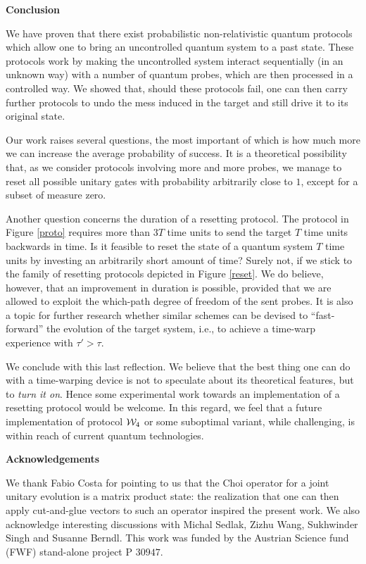 \documentclass[twocolumn,prx,aps,longbibliography]{revtex4-1}
\begin{document}
\vspace{10pt}
\noindent\textbf{Conclusion}

We have proven that there exist probabilistic non-relativistic quantum protocols which allow one to bring an uncontrolled quantum system to a past state. These protocols work by making the uncontrolled system interact sequentially (in an unknown way) with a number of quantum probes, which are then processed in a controlled way. We showed that, should these protocols fail, one can then carry further protocols to undo the mess induced in the target and still drive it to its original state.

Our work raises several questions, the most important of which is how much more we can increase the average probability of success. It is a theoretical possibility that, as we consider protocols involving more and more probes, we manage to reset all possible unitary gates with probability arbitrarily close to $1$, except for a subset of measure zero. 

Another question concerns the duration of a resetting protocol. The protocol in Figure \ref{proto} requires more than $3T$ time units to send the target $T$ time units backwards in time. Is it feasible to reset the state of a quantum system $T$ time units by investing an arbitrarily short amount of time? Surely not, if we stick to the family of resetting protocols depicted in Figure \ref{reset}. We do believe, however, that an improvement in duration is possible, provided that we are allowed to exploit the which-path degree of freedom of the sent probes. It is also a topic for further research whether similar schemes can be devised to ``fast-forward'' the evolution of the target system, i.e., to achieve a time-warp experience with $\tau'> \tau$.

We conclude with this last reflection. We believe that the best thing one can do with a time-warping device is not to speculate about its theoretical features, but to \emph{turn it on}. Hence some experimental work towards an implementation of a resetting protocol would be welcome. In this regard, we feel that a future implementation of protocol ${\cal W}_4$ or some suboptimal variant, while challenging, is within reach of current quantum technologies.



\vspace{10pt}
\noindent\textbf{Acknowledgements}

\noindent We thank Fabio Costa for pointing to us that the Choi operator for a joint unitary evolution is a matrix product state: the realization that one can then apply cut-and-glue vectors to such an operator inspired the present work. We also acknowledge interesting discussions with Michal Sedlak, Zizhu Wang, Sukhwinder Singh and Susanne Berndl. This work was funded by the Austrian Science fund (FWF) stand-alone project P $30947$.
\end{document}
